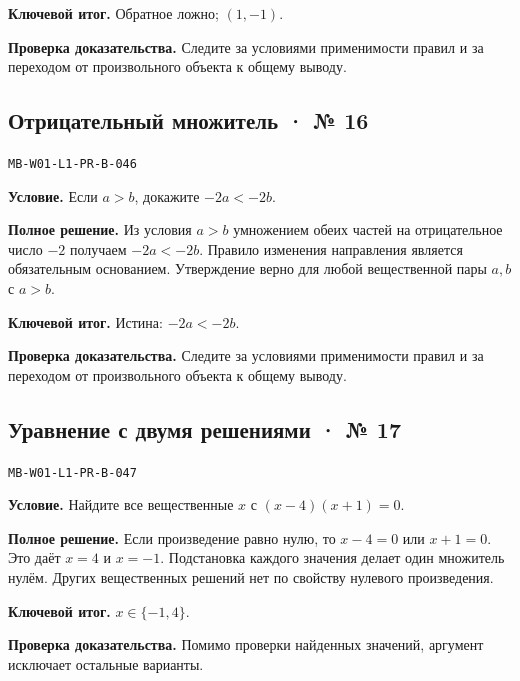 \documentclass[11pt,a4paper,openany]{book}
\newcommand{\muid}[1]{\texttt{\footnotesize #1}}
\begin{document}
\begin{learnbox}\textbf{Ключевой итог.} Обратное ложно; $(1,-1)$.\par \textbf{Проверка доказательства.} 
Следите за условиями применимости правил и за переходом от произвольного объекта к общему выводу. 
\end{learnbox}

\subsection*{Отрицательный множитель · № 16}\hypertarget{solution:MB-W01-L1-PR-B-046}{}

\muid{MB-W01-L1-PR-B-046}\par

\textbf{Условие.} Если $a>b$, докажите $-2a<-2b$.\par

\textbf{Полное решение.} Из условия $a>b$ умножением обеих частей на отрицательное число $-2$ получаем $-2a<-2b$. Правило изменения направления является обязательным основанием. Утверждение верно для любой вещественной пары $a,b$ с $a>b$.


\begin{learnbox}\textbf{Ключевой итог.} Истина: $-2a<-2b$.\par \textbf{Проверка доказательства.} 
Следите за условиями применимости правил и за переходом от произвольного объекта к общему выводу. 
\end{learnbox}

\subsection*{Уравнение с двумя решениями · № 17}\hypertarget{solution:MB-W01-L1-PR-B-047}{}

\muid{MB-W01-L1-PR-B-047}\par

\textbf{Условие.} Найдите все вещественные $x$ с $(x-4)(x+1)=0$.\par

\textbf{Полное решение.} Если произведение равно нулю, то $x-4=0$ или $x+1=0$. Это даёт $x=4$ и $x=-1$. Подстановка каждого значения делает один множитель нулём. Других вещественных решений нет по свойству нулевого произведения.


\begin{learnbox}\textbf{Ключевой итог.} $x\in\{-1,4\}$.\par \textbf{Проверка доказательства.} 
Помимо проверки найденных значений, аргумент исключает остальные варианты. 
\end{learnbox}
\end{document}
